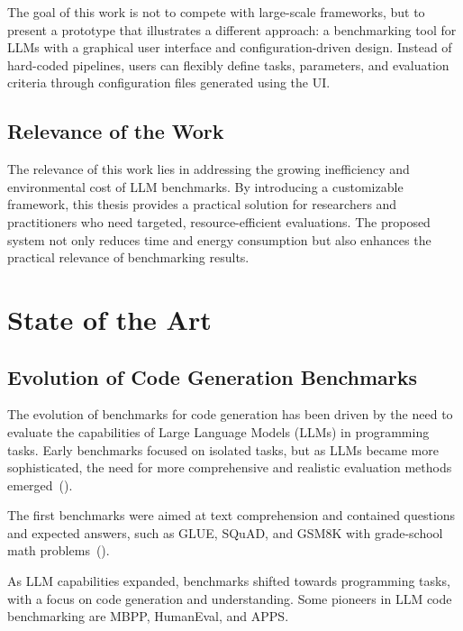 The goal of this work is not to compete with large-scale frameworks, but to present a prototype that illustrates a different approach: a benchmarking tool for LLMs with a graphical user interface and configuration-driven design.
Instead of hard-coded pipelines, users can flexibly define tasks, parameters, and evaluation criteria through configuration files generated using the UI.

\subsection{Relevance of the Work}

The relevance of this work lies in addressing the growing inefficiency and environmental cost of LLM benchmarks.
By introducing a customizable framework, this thesis provides a practical solution for researchers and practitioners who need targeted, resource-efficient evaluations.
The proposed system not only reduces time and energy consumption but also enhances the practical relevance of benchmarking results.

\section{State of the Art}

\subsection{Evolution of Code Generation Benchmarks}

The evolution of benchmarks for code generation has been driven by the need to evaluate the capabilities of Large Language Models (LLMs) in programming tasks.
Early benchmarks focused on isolated tasks, but as LLMs became more sophisticated, the need for more comprehensive and realistic evaluation methods emerged~(\cite{paul2024benchmarksmetricsevaluationscode}).

The first benchmarks were aimed at text comprehension and contained questions and expected answers, such as GLUE, SQuAD, and GSM8K with grade-school math problems~(\cite{vendrow2025largelanguagemodelbenchmarks}).

As LLM capabilities expanded, benchmarks shifted towards programming tasks, with a focus on code generation and understanding.
Some pioneers in LLM code benchmarking are MBPP, HumanEval, and APPS.

